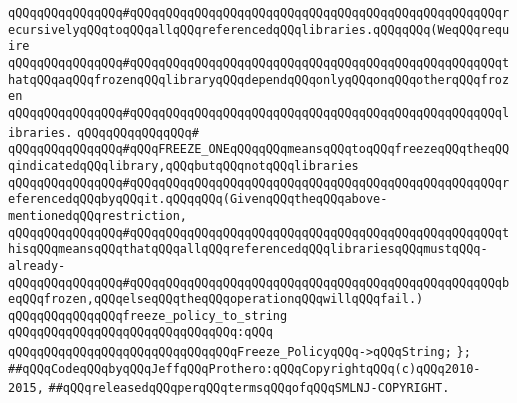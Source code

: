 \verb|qQQqqQQqqQQqqQQq#qQQqqQQqqQQqqQQqqQQqqQQqqQQqqQQqqQQqqQQqqQQqqQQqqQQqrecursivelyqQQqtoqQQqallqQQqreferencedqQQqlibraries.qQQqqQQq(WeqQQqrequire|\newline
\verb|qQQqqQQqqQQqqQQq#qQQqqQQqqQQqqQQqqQQqqQQqqQQqqQQqqQQqqQQqqQQqqQQqqQQqthatqQQqaqQQqfrozenqQQqlibraryqQQqdependqQQqonlyqQQqonqQQqotherqQQqfrozen|\newline
\verb|qQQqqQQqqQQqqQQq#qQQqqQQqqQQqqQQqqQQqqQQqqQQqqQQqqQQqqQQqqQQqqQQqqQQqlibraries.|\newline
\verb|qQQqqQQqqQQqqQQq#|\newline
\verb|qQQqqQQqqQQqqQQq#qQQqFREEZE_ONEqQQqqQQqmeansqQQqtoqQQqfreezeqQQqtheqQQqindicatedqQQqlibrary,qQQqbutqQQqnotqQQqlibraries|\newline
\verb|qQQqqQQqqQQqqQQq#qQQqqQQqqQQqqQQqqQQqqQQqqQQqqQQqqQQqqQQqqQQqqQQqqQQqreferencedqQQqbyqQQqit.qQQqqQQq(GivenqQQqtheqQQqabove-mentionedqQQqrestriction,|\newline
\verb|qQQqqQQqqQQqqQQq#qQQqqQQqqQQqqQQqqQQqqQQqqQQqqQQqqQQqqQQqqQQqqQQqqQQqthisqQQqmeansqQQqthatqQQqallqQQqreferencedqQQqlibrariesqQQqmustqQQq-already-|\newline
\verb|qQQqqQQqqQQqqQQq#qQQqqQQqqQQqqQQqqQQqqQQqqQQqqQQqqQQqqQQqqQQqqQQqqQQqbeqQQqfrozen,qQQqelseqQQqtheqQQqoperationqQQqwillqQQqfail.)|\newline
\newline
\verb|qQQqqQQqqQQqqQQqfreeze_policy_to_string|\newline
\verb|qQQqqQQqqQQqqQQqqQQqqQQqqQQqqQQq:qQQq|\newline
\verb|qQQqqQQqqQQqqQQqqQQqqQQqqQQqqQQqFreeze_PolicyqQQq->qQQqString;|\newline
\verb|};|\newline
\newline
\newline
\newline
\verb|##qQQqCodeqQQqbyqQQqJeffqQQqProthero:qQQqCopyrightqQQq(c)qQQq2010-2015,|\newline
\verb|##qQQqreleasedqQQqperqQQqtermsqQQqofqQQqSMLNJ-COPYRIGHT.|\newline

